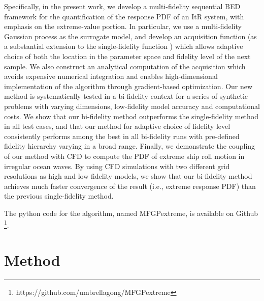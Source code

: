 \documentclass[11pt]{article}
\begin{document}
Specifically, in the present work, we develop a multi-fidelity sequential BED framework for the quantification of the response PDF of an ItR system, with emphasis on the extreme-value portion. In particular, we use a multi-fidelity Gaussian process as the surrogate model, and develop an acquisition function (as a substantial extension to the single-fidelity function \cite{blanchard2021output}) which allows adaptive choice of both the location in the parameter space and fidelity level of the next sample. We also construct an analytical computation of the acquisition which avoids expensive numerical integration and enables high-dimensional implementation of the algorithm through gradient-based optimization. 
Our new method is systematically tested in a bi-fidelity context for a series of synthetic problems with varying dimensions, low-fidelity model accuracy and computational costs. 
We show that our bi-fidelity method outperforms the single-fidelity method in all test cases, and that our method for adaptive choice of fidelity level consistently performs among the best in all bi-fidelity runs with pre-defined fidelity hierarchy varying in a broad range. Finally, we demonstrate the coupling of our method with CFD to compute the PDF of extreme ship roll motion in irregular ocean waves. By using CFD simulations with two different grid resolutions as high and low fidelity models, we show that our bi-fidelity method achieves much faster convergence of the result (i.e., extreme response PDF) than the previous single-fidelity method. 

The python code for the algorithm, named MFGPextreme, is available on Github \footnote{https://github.com/umbrellagong/MFGPextreme}.  

\section{Method}
\end{document}

